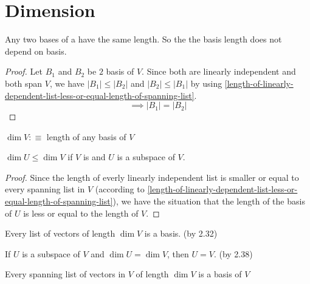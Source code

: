 \section{Dimension}

\setcounter{thm}{33}
\begin{thm} Any two bases of a \fdvs have the same length. So the the basis length does not depend on basis.
\end{thm}
\begin{proof}
  Let $B_1$ and $B_2$ be $2$ basis of $V$. Since both are linearly independent and both span $V$, we have $|B_1| \leq |B_2|$ and $|B_2| \leq |B_1|$ by using \ref{length-of-linearly-dependent-list-less-or-equal-length-of-spanning-list}.
  \begin{equation}
    \implies |B_1|=|B_2|
  \end{equation}
\end{proof}

\begin{mydef} $\dim V :\equiv$ length of any basis of $V$
\end{mydef}

\setcounter{thm}{36}
\begin{thm} $\dim U \leq \dim V$ if $V$ is \fd  and $U$ is a subspace of $V$.
\end{thm}
\begin{proof}
  Since the length of everly linearly independent list is smaller or equal to every spanning list in $V$ (according to \ref{length-of-linearly-dependent-list-less-or-equal-length-of-spanning-list}), we have the situation that the length of the basis of $U$ is less or equal to the length of $V$.
\end{proof}


\begin{thm}
  \label{every-lid-list-of-length-dim-v-is -a-basis-of-v}
  Every \lid list of vectors of length $\dim V$ is a basis. (by 2.32)
\end{thm}

\begin{thm} If $U$ is a subspace of $V$ and $\dim U = \dim V$, then $U=V$. (by 2.38)
\end{thm}

\setcounter{thm}{41}
\begin{thm}
  Every spanning list of vectors in $V$ of length $\dim V$ is a basis of $V$
\end{thm}


